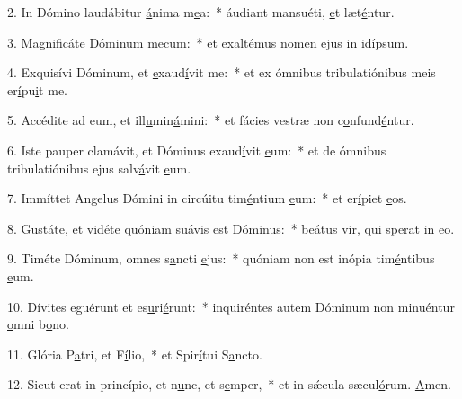 2. In Dómino laudábitur \uline{á}nima m\uline{e}a:~* áudiant mansuéti, \uline{e}t læt\uline{é}ntur.\par 
3. Magnificáte D\uline{ó}minum m\uline{e}cum:~* et exaltémus nomen ejus \uline{i}n id\uline{í}psum.\par 
4. Exquisívi Dóminum, et \uline{e}xaud\uline{í}vit me:~* et ex ómnibus tribulatiónibus meis er\uline{í}pu\uline{i}t me.\par 
5. Accédite ad eum, et ill\uline{u}min\uline{á}mini:~* et fácies vestræ non c\uline{o}nfund\uline{é}ntur.\par 
6. Iste pauper clamávit, et Dóminus exaud\uline{í}vit \uline{e}um:~* et de ómnibus tribulatiónibus ejus salv\uline{á}vit \uline{e}um.\par 
7. Immíttet Angelus Dómini in circúitu tim\uline{é}ntium \uline{e}um:~* et er\uline{í}piet \uline{e}os.\par 
8. Gustáte, et vidéte quóniam su\uline{á}vis est D\uline{ó}minus:~* beátus vir, qui sp\uline{e}rat in \uline{e}o.\par 
9. Timéte Dóminum, omnes s\uline{a}ncti \uline{e}jus:~* quóniam non est inópia tim\uline{é}ntibus \uline{e}um.\par 
10. Dívites eguérunt et es\uline{u}ri\uline{é}runt:~* inquiréntes autem Dóminum non minuéntur \uline{o}mni b\uline{o}no.\par 
11. Glória P\uline{a}tri, et F\uline{í}lio,~* et Spir\uline{í}tui S\uline{a}ncto.\par 
12. Sicut erat in princípio, et n\uline{u}nc, et s\uline{e}mper,~* et in sǽcula sæcul\uline{ó}rum. \uline{A}men.\par 
